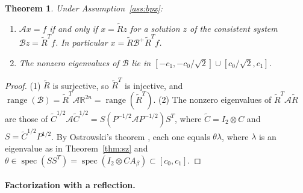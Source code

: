 \documentclass[11pt,a4paper]{article}
\newcommand{\R}{\mathbb{R}}
\newcommand{\A}{\mathcal{A}}
\newcommand{\B}{\mathcal{B}}
\newcommand{\Rt}{\widetilde R}
\newtheorem{theorem}{Theorem}[section]
\theoremstyle{remark}
\begin{document}
\begin{theorem}\label{thm:B}
Under Assumption~\ref{ass:bpx}:
\begin{enumerate}
\item $\A x=f$ if and only if $x=\Rt z$ for a solution $z$ of the consistent
  system $\B z=\Rt^Tf$. In particular $x=\Rt\B^+\Rt^Tf$.
\item The nonzero eigenvalues of $\B$ lie in $[-c_1,-c_0/\sqrt2]\cup[c_0/\sqrt2,c_1]$.
\end{enumerate}
\end{theorem}
\begin{proof}
(1) $\Rt$ is surjective, so $\Rt^T$ is injective, and
$\operatorname{range}(\B)=\Rt^T\A\R^{2n}=\operatorname{range}(\Rt^T)$.
(2) The nonzero eigenvalues of $\Rt^T\A\Rt$ are those of
$\widetilde C^{1/2}\A\widetilde C^{1/2}=S(P^{-1/2}\A P^{-1/2})S^T$, where
$\widetilde C=I_2\otimes C$ and $S=\widetilde C^{1/2}P^{1/2}$. By Ostrowski's theorem
\cite[Thm.~4.5.9]{HJ13}, each one equals $\theta\lambda$, where $\lambda$ is an
eigenvalue as in Theorem~\ref{thm:sz} and $\theta\in\operatorname{spec}(SS^T)=\operatorname{spec}(I_2\otimes CA_\beta)
\subset[c_0,c_1]$.
\end{proof}

\paragraph{Factorization with a reflection.}
\end{document}
